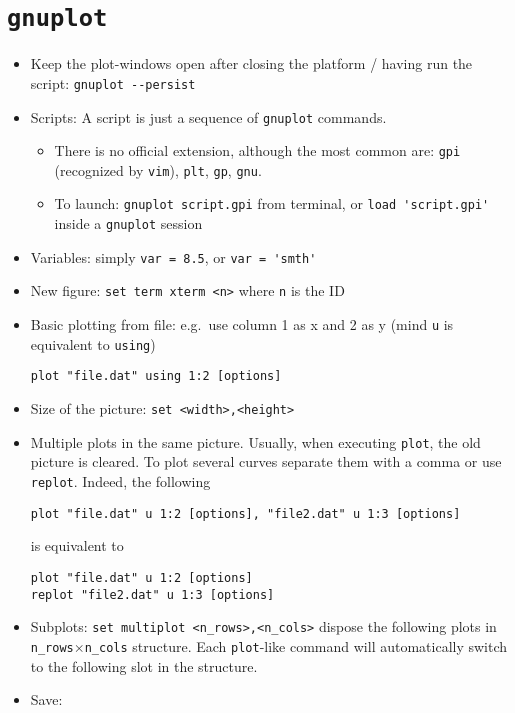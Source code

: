 \documentclass[a4paper,12pt,%
              final%
              ]{article}
\begin{document}
\section{\texttt{gnuplot}}
\begin{itemize}
  \item Keep the plot-windows open after closing the platform / having run the script: \verb|gnuplot --persist|
  \item Scripts: A script is just a sequence of \texttt{gnuplot} commands.
    \begin{itemize}
      \item There is no official extension, although the most common are: \texttt{gpi} (recognized by \texttt{vim}), \texttt{plt}, \texttt{gp}, \texttt{gnu}.
      \item To launch: \verb|gnuplot script.gpi| from terminal, or \verb|load 'script.gpi'| inside a \verb|gnuplot| session
    \end{itemize}
  \item Variables: simply \verb|var = 8.5|, or \verb|var = 'smth'|
  \item New figure: \verb|set term xterm <n>| where \verb|n| is the ID
  \item Basic plotting from file: e.g.\ use column 1 as x and 2 as y (mind \texttt{u} is equivalent to \texttt{using})
\begin{verbatim}
plot "file.dat" using 1:2 [options]
\end{verbatim}
  \item Size of the picture: \verb|set <width>,<height>|
  \item Multiple plots in the same picture. Usually, when executing \texttt{plot}, the old picture is cleared. To plot several curves separate them with a comma or use \verb|replot|. Indeed, the following
\begin{verbatim}
plot "file.dat" u 1:2 [options], "file2.dat" u 1:3 [options]
\end{verbatim}
    is equivalent to
\begin{verbatim}
plot "file.dat" u 1:2 [options]
replot "file2.dat" u 1:3 [options]
\end{verbatim}
  \item Subplots: \verb|set multiplot <n_rows>,<n_cols>| dispose the following plots in \verb|n_rows|$\times$\verb|n_cols| structure. Each \verb|plot|-like command will automatically switch to the following slot in the structure.
  \item Save:
    \begin{enumerate}

\end{enumerate}
\end{itemize}
\end{document}
